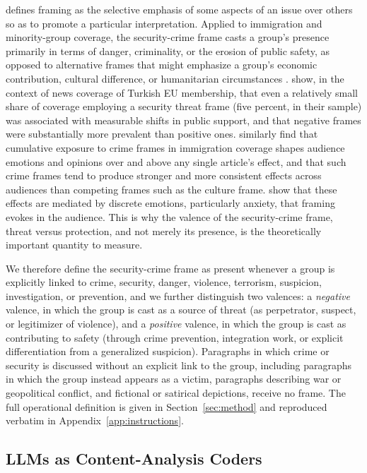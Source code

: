 \documentclass[a4paper,oneside,bibliography=totoc]{scrartcl}
\begin{document}
\citet{entman1993} defines framing as the selective emphasis of some aspects of an issue over others so as to promote a particular interpretation. Applied to immigration and minority-group coverage, the security-crime frame casts a group's presence primarily in terms of danger, criminality, or the erosion of public safety, as opposed to alternative frames that might emphasize a group's economic contribution, cultural difference, or humanitarian circumstances \citep{eberl2018}. \citet{devreese2011} show, in the context of news coverage of Turkish EU membership, that even a relatively small share of coverage employing a security threat frame (five percent, in their sample) was associated with measurable shifts in public support, and that negative frames were substantially more prevalent than positive ones. \citet{guo2023} similarly find that cumulative exposure to crime frames in immigration coverage shapes audience emotions and opinions over and above any single article's effect, and that such crime frames tend to produce stronger and more consistent effects across audiences than competing frames such as the culture frame. \citet{lecheler2015} show that these effects are mediated by discrete emotions, particularly anxiety, that framing evokes in the audience. This is why the valence of the security-crime frame, threat versus protection, and not merely its presence, is the theoretically important quantity to measure.

We therefore define the security-crime frame as present whenever a group is explicitly linked to crime, security, danger, violence, terrorism, suspicion, investigation, or prevention, and we further distinguish two valences: a \emph{negative} valence, in which the group is cast as a source of threat (as perpetrator, suspect, or legitimizer of violence), and a \emph{positive} valence, in which the group is cast as contributing to safety (through crime prevention, integration work, or explicit differentiation from a generalized suspicion). Paragraphs in which crime or security is discussed without an explicit link to the group, including paragraphs in which the group instead appears as a victim, paragraphs describing war or geopolitical conflict, and fictional or satirical depictions, receive no frame. The full operational definition is given in Section~\ref{sec:method} and reproduced verbatim in Appendix~\ref{app:instructions}.

\subsection{LLMs as Content-Analysis Coders}
\end{document}
